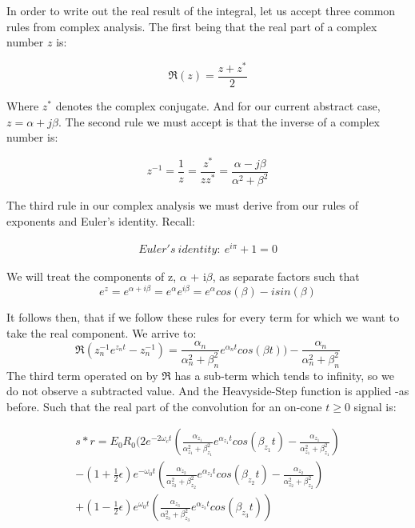 \documentclass[amsmath,amssymb,aps,prd,10pt,twocolumn,showkeys]{revtex4}
\begin{document}
In order to write out the real result of the integral, let us accept three common rules from complex analysis. The first being that 
the real part of a complex number $z$ is:

\begin{equation}
\Re(z) = \frac{z+z^*}{2}
\end{equation}

Where $z^*$ denotes the complex conjugate. And for our current abstract case, $z = \alpha+j\beta$.  The second rule we must accept is that the inverse of a complex number is: 

\begin{equation}
z^{-1} = \frac{1}{z} = \frac{z^*}{zz^*} = \frac{\alpha-j\beta}{\alpha^2+\beta^2}
\end{equation}

The third rule in our complex analysis we must derive from our rules of exponents and Euler's identity. Recall:

\begin{multline}
 Euler's \ identity: \ e^{i\pi} + 1= 0
\end{multline}

We will treat the components of z, $\alpha$ + i$\beta$, as separate factors such that
\begin{equation}
e^{z} = e^{\alpha+i{\beta}} = e^{\alpha}e^{i\beta} = e^{\alpha}cos(\beta)-isin(\beta)
\end{equation}

It follows then, that if we follow these rules for every term for which we want to take the real component. We arrive to: 
\begin{equation}
 \Re( z_n^{-1} e^{z_n t} - z_n^{-1}) = \frac{\alpha_n}{\alpha_n^2+\beta_n^2}e^{\alpha_n t}cos(\beta t)) - \frac{\alpha_n}{\alpha_n^2+\beta_n^2}   
\end{equation}
The third term operated on by $\Re$ has a sub-term which tends to infinity, so we do not observe a subtracted value. And the Heavyside-Step function is applied -as before. Such that the real part of the convolution for an on-cone $t\ge0$ signal is:

\begin{multline}
s * r = E_0R_0(2e^{-2\omega_ct}(\frac{\alpha_{z_1}}{\alpha_{z_1}^2+\beta_{z_1}^2}e^{\alpha_{z_1}t}cos(\beta_{z_1}t)- \frac{\alpha_{z_1}}{\alpha_{z_1}^2+\beta_{z_1}^2}) \\
 -(1+\frac{1}{2}\epsilon)e^{-\omega_0t}(\frac{\alpha_{z_2}}{\alpha_{z_2}^2+\beta_{z_2}^2}e^{\alpha_{z_2}t}cos(\beta_{z_2}t)- \frac{\alpha_{z_2}}{\alpha_{z_2}^2+\beta_{z_2}^2}) \\ + (1-\frac{1}{2}\epsilon)e^{\omega_0t}(\frac{\alpha_{z_3}}{\alpha_{z_3}^2+\beta_{z_3}^2}e^{\alpha_{z_3}t}cos(\beta_{z_3}t))
\end{multline}
\end{document}
